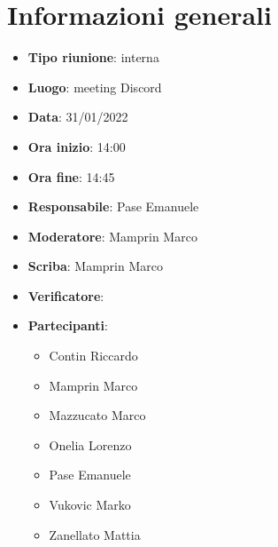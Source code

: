 \section{Informazioni generali}
\begin{itemize}
  \item \textbf{Tipo riunione}: interna
  \item \textbf{Luogo}: meeting Discord
  \item \textbf{Data}: 31/01/2022
  \item \textbf{Ora inizio}: 14:00
  \item \textbf{Ora fine}: 14:45
  \item \textbf{Responsabile}: Pase Emanuele
  \item \textbf{Moderatore}: Mamprin Marco
  \item \textbf{Scriba}: Mamprin Marco
  \item \textbf{Verificatore}: 
  \item \textbf{Partecipanti}:
  \begin{itemize}
    \item Contin Riccardo
    \item Mamprin Marco
    \item Mazzucato Marco
    \item Onelia Lorenzo
    \item Pase Emanuele
    \item Vukovic Marko
    \item Zanellato Mattia
  \end{itemize}
\end{itemize}
